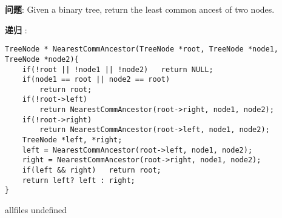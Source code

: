 \documentclass{article}
\begin{document}
\begin{CJK}{UTF8}{gbsn}     %

\else
	
\begin{description}
	\item{\textbf{问题}}: Given a binary tree,  return the least common ancest of two nodes.
	\item{\textbf{递归}} : 
	\\
	\begin{lstlisting}
TreeNode * NearestCommAncestor(TreeNode *root, TreeNode *node1, TreeNode *node2){
    if(!root || !node1 || !node2)   return NULL;
    if(node1 == root || node2 == root)
        return root;
    if(!root->left)
        return NearestCommAncestor(root->right, node1, node2);
    if(!root->right)
        return NearestCommAncestor(root->left, node1, node2);
    TreeNode *left, *right;
    left = NearestCommAncestor(root->left, node1, node2);
    right = NearestCommAncestor(root->right, node1, node2);
    if(left && right)   return root;
    return left? left : right;
}
	\end{lstlisting}
\end{description}

\fi

\ifx allfiles undefined
\end{CJK}
\end{document}
